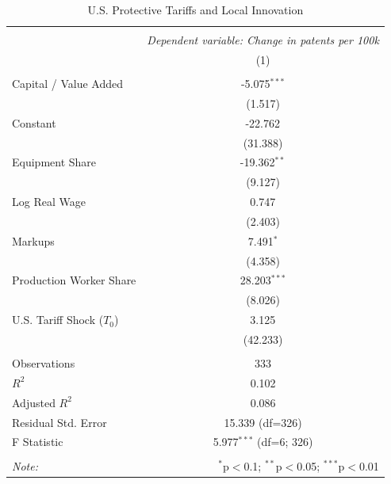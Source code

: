 \begin{table}[!htbp] \centering
  \caption{U.S. Protective Tariffs and Local Innovation}
  \label{tab:main_regression}
\begin{tabular}{@{\extracolsep{5pt}}lc}
\\[-1.8ex]\hline
\hline \\[-1.8ex]
& \multicolumn{1}{c}{\textit{Dependent variable: Change in patents per 100k}} \
\cr \cline{2-2}
\\[-1.8ex] & (1) \\
\hline \\[-1.8ex]
 Capital / Value Added & -5.075$^{***}$ \\
& (1.517) \\
 Constant & -22.762$^{}$ \\
& (31.388) \\
 Equipment Share & -19.362$^{**}$ \\
& (9.127) \\
 Log Real Wage & 0.747$^{}$ \\
& (2.403) \\
 Markups & 7.491$^{*}$ \\
& (4.358) \\
 Production Worker Share & 28.203$^{***}$ \\
& (8.026) \\
 U.S. Tariff Shock ($T_0$) & 3.125$^{}$ \\
& (42.233) \\
\hline \\[-1.8ex]
 Observations & 333 \\
 $R^2$ & 0.102 \\
 Adjusted $R^2$ & 0.086 \\
 Residual Std. Error & 15.339 (df=326) \\
 F Statistic & 5.977$^{***}$ (df=6; 326) \\
\hline
\hline \\[-1.8ex]
\textit{Note:} & \multicolumn{1}{r}{$^{*}$p$<$0.1; $^{**}$p$<$0.05; $^{***}$p$<$0.01} \\
\end{tabular}
\end{table}